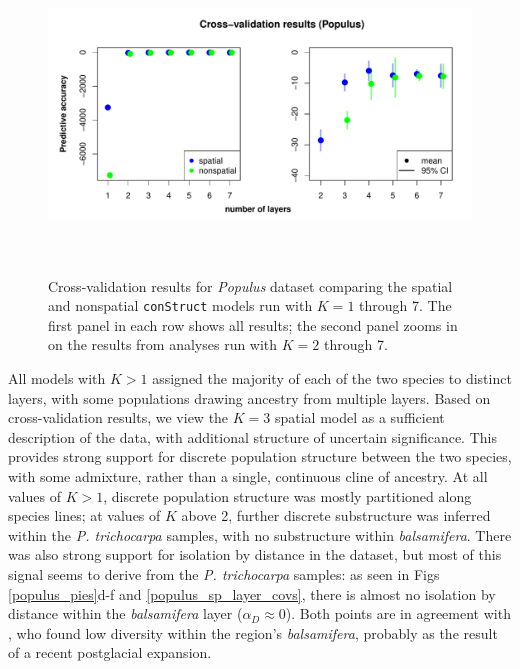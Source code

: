 \documentclass[12pt]{article}
\newcommand{\tri}{\textit{trichocarpa}}
\newcommand{\bals}{\textit{balsamifera}}
\begin{document}
\begin{figure}
	\centering
		{\includegraphics[width=6in,height=3in]{figs/populus/populus_std_xval.pdf}}
	\caption{
	Cross-validation results for \textit{Populus} dataset 
	comparing the spatial and nonspatial \texttt{conStruct} models run with $K=1$ through 7.  
	The first panel in each row shows all results; 
	the second panel zooms in on the results from analyses run with $K = 2$ through 7.
    }\label{populus_xvals}
\end{figure}

All models with $K>1$ assigned the majority of each of the two species
to distinct layers, with some populations drawing ancestry from multiple layers.
Based on cross-validation results, we view the $K=3$ spatial model 
as a sufficient description of the data,
with additional structure of uncertain significance.
This provides strong support for discrete population structure between the two species,
with some admixture,
rather than a single, continuous cline of ancestry.
At all values of $K>1$, discrete population structure was mostly partitioned along species lines; 
at values of $K$ above 2, further discrete substructure was inferred within the \textit{P. trichocarpa} samples,
with no substructure within \bals{}.
There was also strong support for isolation by distance in the dataset, 
but most of this signal seems to derive from the \textit{P. trichocarpa} samples:
as seen in Figs \ref{populus_pies}d-f and \ref{populus_sp_layer_covs},
there is almost no isolation by distance within the \bals{} layer ($\alpha_D \approx 0$).
Both points are
in agreement with \citet{keller_etal_2010}, 
who found low diversity within the region's \bals{},
probably as the result of a recent postglacial expansion.
\end{document}
